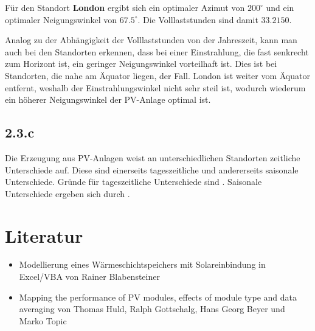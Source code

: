\documentclass[a4paper,12pt]{article}
\begin{document}
	Für den Standort \textbf{London} ergibt sich ein optimaler Azimut von $200^{\circ}$ und ein optimaler Neigungswinkel von $67.5^{\circ}$. Die Volllaststunden sind damit $33.2150$.\\ \par
	Analog zu der Abhängigkeit der Volllaststunden von der Jahreszeit, kann man auch bei den Standorten erkennen, dass bei einer Einstrahlung, die fast senkrecht zum Horizont ist, ein geringer Neigungswinkel vorteilhaft ist. Dies ist bei Standorten, die nahe am Äquator liegen, der Fall.\newline
	London ist weiter vom Äquator entfernt, weshalb der Einstrahlungswinkel nicht sehr steil ist, wodurch wiederum ein höherer Neigungswinkel der PV-Anlage optimal ist.
	\subsection{2.3.c}
	Die Erzeugung aus PV-Anlagen weist an unterschiedlichen Standorten zeitliche Unterschiede auf. Diese sind einerseits tageszeitliche und andererseits saisonale Unterschiede.\newline
	Gründe für tageszeitliche Unterschiede sind .
	Saisonale Unterschiede ergeben sich durch .
	\newpage
	\section{Literatur}
	\begin{itemize}
		\item Modellierung eines Wärmeschichtspeichers mit
		Solareinbindung in Excel/VBA von Rainer Blabensteiner
		\item Mapping the performance of PV modules, effects of module type and data averaging von Thomas Huld, Ralph Gottschalg, Hans Georg Beyer und Marko Topic
	\end{itemize}
	\newpage
	\listoffigures
\end{document}
